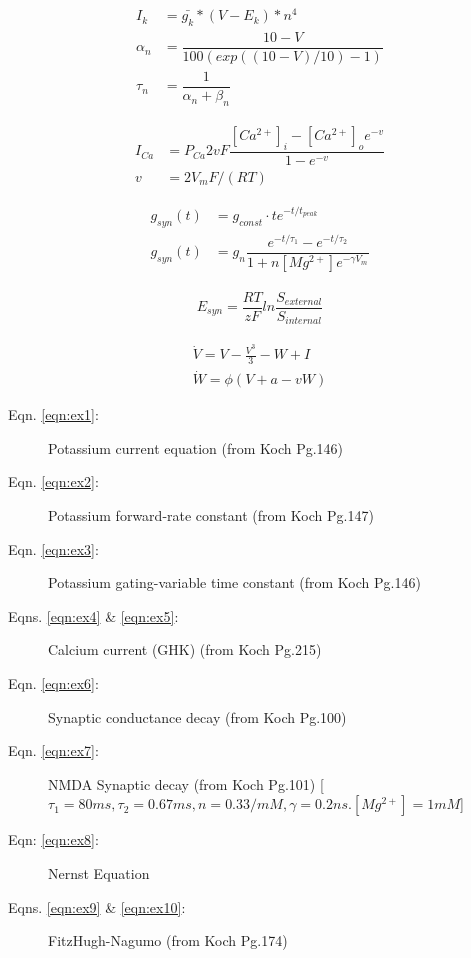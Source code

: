 \documentclass{article}
\begin{document}
\begin{eqnarray}
I_k &= \bar{g_{k}} * (V-E_k) * n^{4}                 \label{eqn:ex1} \\ 
\alpha_n &= \dfrac{10-V}{100(exp((10-V)/10)-1)}       \label{eqn:ex2} \\
\tau_n &= \dfrac{1}{\alpha_n + \beta_n}               \label{eqn:ex3} 
\end{eqnarray}

\begin{eqnarray}
I_{Ca} &= P_{Ca} 2 v F \dfrac{\left[Ca^{2+}\right]_i - \left[Ca^{2+}\right]_o e^{-v} } { 1-e^{-v} }\label{eqn:ex4} \\ 
v &= 2V_m F / (RT) \label{eqn:ex5} 
\end{eqnarray}

\begin{eqnarray}
g_{syn}(t) &= g_{const} \cdot t e^{-t/t_{peak}} \label{eqn:ex6} \\
g_{syn}(t) &= g_n \dfrac{ e^{-t/\tau_1} - e^{-t/\tau_2} }{1+n\left[Mg^{2+}\right]e^{-\gamma V_m} }  \label{eqn:ex7} 
\end{eqnarray}

\begin{eqnarray}
E_{syn} = \dfrac{RT}{zF} ln \dfrac{ S_{external} }{S_{internal} }  \label{eqn:ex8}
\end{eqnarray}


\begin{eqnarray}
\dot{V} = V - \frac{V^3}{3} -W +I \label{eqn:ex9} \\
\dot{W} = \phi ( V +a-vW) \label{eqn:ex10} 
\end{eqnarray}

\begin{description}
\item[Eqn. \ref{eqn:ex1}:] Potassium current equation (from Koch Pg.146)
\item[Eqn. \ref{eqn:ex2}:] Potassium forward-rate constant (from Koch Pg.147)
\item[Eqn. \ref{eqn:ex3}:] Potassium gating-variable time constant (from Koch Pg.146)
\item[Eqns. \ref{eqn:ex4} \& \ref{eqn:ex5}:] Calcium current (GHK) (from Koch Pg.215)
\item[Eqn. \ref{eqn:ex6}:] Synaptic conductance decay (from Koch Pg.100)
\item[Eqn. \ref{eqn:ex7}:] NMDA Synaptic decay (from Koch Pg.101) [$\tau_1 = 80ms, \tau_2=0.67ms, n=0.33/mM,\gamma=0.2ns. \left[ Mg^{2+} \right]=1mM$]
\item[Eqn: \ref{eqn:ex8}:]  Nernst Equation
\item[Eqns. \ref{eqn:ex9} \& \ref{eqn:ex10}:] FitzHugh-Nagumo (from Koch Pg.174)
\end{description}
\end{document}
